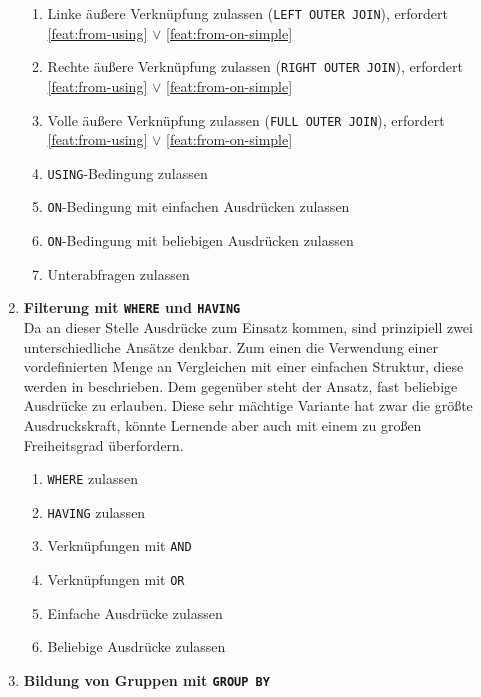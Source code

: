 \begin{enumerate}
\begin{enumerate}[noitemsep]
  \item \label{feat:from-left-join} Linke äußere Verknüpfung zulassen (\texttt{LEFT OUTER JOIN}), erfordert \ref{feat:from-using} $\lor$ \ref{feat:from-on-simple}
  \item \label{feat:from-right-join} Rechte äußere Verknüpfung zulassen (\texttt{RIGHT OUTER JOIN}), erfordert \ref{feat:from-using} $\lor$ \ref{feat:from-on-simple}
  \item \label{feat:from-full-join} Volle äußere Verknüpfung zulassen (\texttt{FULL OUTER JOIN}), erfordert \ref{feat:from-using} $\lor$ \ref{feat:from-on-simple}
  \item \label{feat:from-using} \texttt{USING}-Bedingung zulassen
  \item \label{feat:from-on-simple} \texttt{ON}-Bedingung mit einfachen Ausdrücken zulassen
  \item \label{feat:from-on-expression} \texttt{ON}-Bedingung mit beliebigen Ausdrücken zulassen
  \item \label{feat:from-sub} Unterabfragen zulassen
  \end{enumerate}
\item \textbf{Filterung mit \texttt{WHERE} und \texttt{HAVING}} \\
  Da an dieser Stelle Ausdrücke zum Einsatz kommen, sind prinzipiell zwei unterschiedliche Ansätze denkbar. Zum einen die Verwendung einer vordefinierten Menge an Vergleichen mit einer einfachen Struktur, diese werden in  beschrieben. Dem gegenüber steht der Ansatz, fast beliebige Ausdrücke zu erlauben. Diese sehr mächtige Variante hat zwar die größte Ausdruckskraft, könnte Lernende aber auch mit einem zu großen Freiheitsgrad überfordern.
  \begin{enumerate}[noitemsep]
  \item \label{feat:where-allow} \texttt{WHERE} zulassen
  \item \label{feat:having-allow} \texttt{HAVING} zulassen
  \item \label{feat:where-and} Verknüpfungen mit \texttt{AND}
  \item \label{feat:where-or} Verknüpfungen mit \texttt{OR}
  \item \label{feat:where-simple-expression} Einfache Ausdrücke zulassen
  \item \label{feat:where-expression} Beliebige Ausdrücke zulassen
  \end{enumerate}
\item \textbf{Bildung von Gruppen mit \texttt{GROUP BY}}

\end{enumerate}
